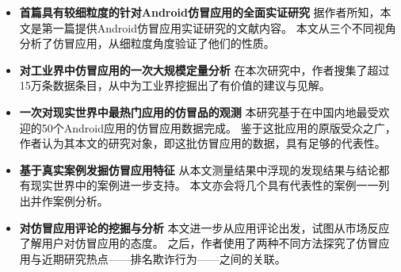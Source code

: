 \begin{itemize}
	\setlength{\itemsep}{1pt}
	\setlength{\parskip}{0pt}
	\setlength{\parsep}{0pt}

	\item{\bf 首篇具有较细粒度的针对Android仿冒应用的全面实证研究}
	据作者所知，本文是第一篇提供Android仿冒应用实证研究的文献内容。
	本文从三个不同视角分析了仿冒应用，从细粒度角度验证了他们的性质。

	\item{\bf 对工业界中仿冒应用的一次大规模定量分析}
	在本次研究中，作者搜集了超过15万条数据条目，从中为工业界挖掘出了有价值的建议与见解。

	\item {\bf 一次对现实世界中最热门应用的仿冒品的观测}
	本研究基于在中国内地最受欢迎的50个Android应用的仿冒应用数据完成。
	鉴于这批应用的原版受众之广，作者认为其本文的研究对象，即这批仿冒应用的数据，具有足够的代表性。

	\item {\bf 基于真实案例发掘仿冒应用特征}
	从本文测量结果中浮现的发现结果与结论都有现实世界中的案例进一步支持。
	本文亦会将几个具有代表性的案例一一列出并作案例分析。

	\item {\bf 对仿冒应用评论的挖掘与分析}
	本文进一步从应用评论出发，试图从市场反应了解用户对仿冒应用的态度。
	之后，作者使用了两种不同方法探究了仿冒应用与近期研究热点——排名欺诈行为——之间的关联。



\end{itemize}


